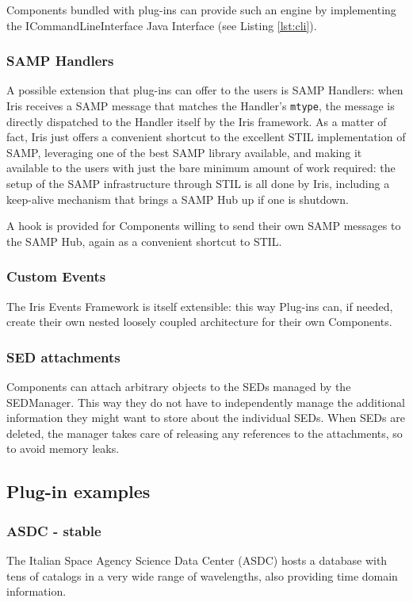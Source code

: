 \documentclass[5p]{elsarticle}
\begin{document}
Components bundled with plug-ins can provide such an engine by implementing the ICommandLineInterface Java Interface (see Listing \ref{lst:cli}).

\subsubsection{SAMP Handlers}
A possible extension that plug-ins can offer to the users is SAMP Handlers: when Iris receives a SAMP message that matches the Handler's \verb|mtype|, the message is directly dispatched to the Handler itself by the Iris framework. As a matter of fact, Iris just offers a convenient shortcut to the excellent STIL implementation of SAMP, leveraging one of the best SAMP library available, and making it available to the users with just the bare minimum amount of work required: the setup of the SAMP infrastructure through STIL is all done by Iris, including a keep-alive mechanism that brings a SAMP Hub up if one is shutdown.

A hook is provided for Components willing to send their own SAMP messages to the SAMP Hub, again as a convenient shortcut to STIL.

\subsubsection{Custom Events}
The Iris Events Framework is itself extensible: this way Plug-ins can, if needed, create their own nested loosely coupled architecture for their own Components.

\subsubsection{SED attachments}
Components can attach arbitrary objects to the SEDs managed by the SEDManager. This way they do not have to independently manage the additional information they might want to store about the individual SEDs. When SEDs are deleted, the manager takes care of releasing any references to the attachments, so to avoid memory leaks.



\subsection{Plug-in examples}
\subsubsection{ASDC - stable}
The Italian Space Agency Science Data Center (ASDC) hosts a database with tens of catalogs in a very wide range of wavelengths, also providing time domain information.
\end{document}

